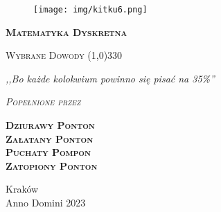 \begin{titlepage}
	\begin{center}
		\begin{figure}[h]
			\centering
			\texttt{[image: img/kitku6.png]}
		\end{figure}

		\Huge
		\textbf{\textsc{Matematyka Dyskretna}}

		\vspace{0.5cm}
		\Large
		\textsc{Wybrane Dowody}
		\line(1,0){330}

		\normalsize

		\vspace{1cm}
		\textit{,,Bo każde kolokwium powinno się pisać na 35\%''}
		\vspace{1cm}

		\textit{\textsc{Popełnione przez}}\\
		\vspace{5mm}

		\textbf{\textsc{Dziurawy Ponton \\ Załatany Ponton \\ Puchaty Pompon \\ Zatopiony Ponton}}

		\vfill

		Kraków \\
		Anno Domini 2023
	\end{center}
\end{titlepage}